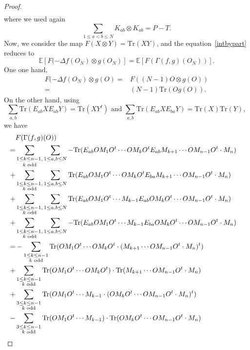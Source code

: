 \documentclass[11pt]{amsart}
\theoremstyle{definition}
\numberwithin{theorem}{section}
\newcommand{\Tr}{\mathrm{Tr}}
\begin{document}
\begin{proof}
\begin{align*}
\end{align*}
where we used again $$\sum_{1\leq a< b\leq N}K_{ab}\otimes K_{ab}=P-T.$$
Now, we consider the map $F(X\otimes Y)=\Tr(XY)$, and the equation~\eqref{intbypart} reduces to
\begin{equation}
\mathbb{E}[F(-\Delta f(O_N)\otimes g(O_N)]=\mathbb{E}[F(\Gamma(f,g)(O_N))].\label{intbyparttwo}
\end{equation}
One one hand,
\begin{align*}
F(-\Delta f(O_N)\otimes g(O)=&F((N-1)O\otimes g(O))\\
=&(N-1)\Tr(Og(O)).
\end{align*}
On the other hand, using 
\[
\sum_{a,b}\Tr(E_{ab}XE_{ab}Y)=\Tr(XY^t) \text{ and } \sum_{a,b}\Tr(E_{ab}XE_{ba}Y)=\Tr(X)\Tr(Y), 
\]
we have
\begin{align*}\lefteqn{%
F(\Gamma(f,g)(O)) } \\
= & \mathop{\sum_{1 \leq k \leq n-1, }}_{k \text{ odd} }
\sum_{1\leq a, b\leq N}-\Tr(E_{ab}O M_1O^t\cdots OM_{k}O^tE_{ab}M_{k+1}\cdots  OM_{n-1}O^t\cdot M_n)\\
+ &
\sum_{\substack{1\leq k \leq n-1,\\k\text{ odd}}}\sum_{1\leq a, b\leq N}\Tr(E_{ab}O M_1O^t\cdots OM_{k}O^tE_{ba}M_{k+1}\cdots  OM_{n-1}O^t\cdot M_n)\\
+ &
\sum_{\substack{1\leq k \leq n-1,\\k\text{ odd}}}\sum_{1\leq a, b\leq N}\Tr( E_{ab}O M_1O^t\cdots M_{k-1}E_{ab}OM_{k}O^t\cdots OM_{n-1}O^t\cdot  M_n)\\
+ &
\sum_{\substack{1\leq k \leq n-1,\\k\text{ odd}}}\sum_{1\leq a, b\leq N} -\Tr(E_{ab} O M_1O^t\cdots M_{k-1}E_{ba}OM_{k}O^t\cdots OM_{n-1}O^t\cdot  M_n)\\
= &
-\sum_{\substack{1\leq k \leq n-1\\k\text{ odd}}}\Tr(O M_1O^t\cdots OM_{k}O^t\cdot (M_{k+1}\cdots  OM_{n-1}O^t\cdot M_n)^t)\\
+ &
\sum_{\substack{1\leq k \leq n-1\\k\text{ odd}}}\Tr(O M_1O^t\cdots OM_{k}O^t)\cdot \Tr(M_{k+1}\cdots  OM_{n-1}O^t\cdot M_n)\\
+ &
\sum_{\substack{3\leq k \leq n-1\\k\text{ odd}}}\Tr(O M_1O^t\cdots M_{k-1}\cdot (OM_{k}O^t\cdots OM_{n-1}O^t\cdot  M_n)^t)\\
- &
\sum_{\substack{3\leq k \leq n-1\\k\text{ odd}}}\Tr(O M_1O^t\cdots M_{k-1})\cdot \Tr(OM_{k}O^t\cdots OM_{n-1}O^t\cdot  M_n)

\end{align*}
\end{proof}
\end{document}

